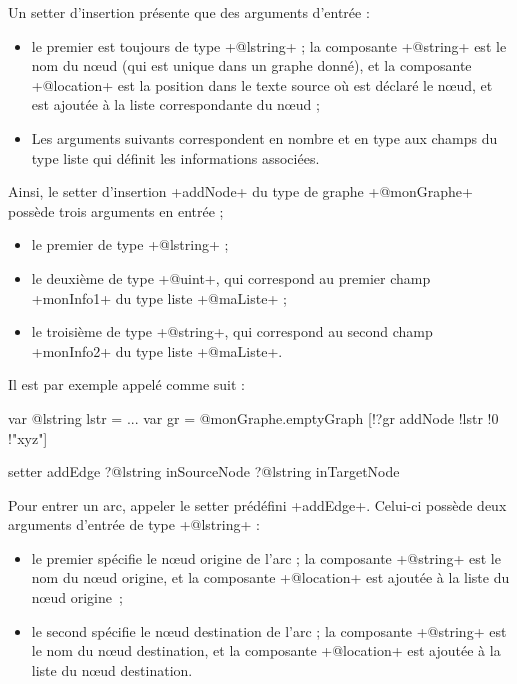 Un setter d'insertion présente que des arguments d'entrée :
\begin{itemize}
  \item le premier est toujours de type \ggst+@lstring+ ; la composante \ggst+@string+ est le nom du nœud (qui est unique dans un graphe donné), et la composante \ggst+@location+ est la position dans le texte source où est déclaré le nœud, et est ajoutée à la liste correspondante du nœud ;
  \item Les arguments suivants correspondent en nombre et en type aux champs du type liste qui définit les informations associées.
\end{itemize}

Ainsi, le setter d'insertion \ggst+addNode+ du type de graphe \ggst+@monGraphe+ possède trois arguments en entrée ;
\begin{itemize}
  \item le premier de type \ggst+@lstring+ ;
  \item le deuxième de type \ggst+@uint+, qui correspond au premier champ \ggst+monInfo1+ du type liste \ggst+@maListe+ ;
  \item le troisième de type \ggst+@string+, qui correspond au second champ \ggst+monInfo2+ du type liste \ggst+@maListe+.
\end{itemize}

Il est par exemple appelé comme suit :
\begin{galgas3}
var @lstring lstr = ...
var gr = @monGraphe.emptyGraph
[!?gr addNode !lstr !0 !"xyz"]
\end{galgas3}





\begin{galgas3}
setter addEdge ?@lstring inSourceNode ?@lstring inTargetNode
\end{galgas3}

Pour entrer un arc, appeler le setter prédéfini \ggst+addEdge+. Celui-ci possède deux arguments d'entrée de type \ggst+@lstring+ :
\begin{itemize}
  \item le premier spécifie le nœud origine de l'arc ; la composante \ggst+@string+ est le nom du nœud origine, et la composante \ggst+@location+ est ajoutée à la liste du nœud origine~;
  \item le second spécifie le nœud destination de l'arc ; la composante \ggst+@string+ est le nom du nœud destination, et la composante \ggst+@location+ est ajoutée à la liste du nœud destination.
\end{itemize}







